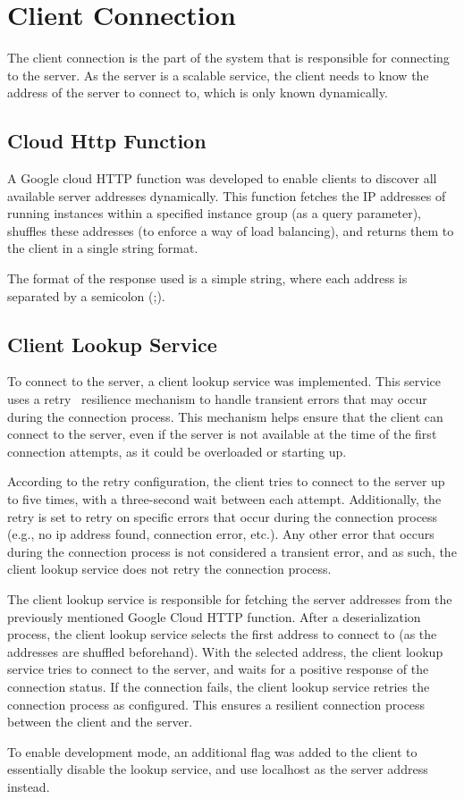 \chapter{Client Connection}\label{ch:client-connection}

The client connection is the part of the system that is responsible for connecting to the server.
As the server is a scalable service, the client needs to know the address of the server to connect to, which is only known dynamically.


\section{Cloud Http Function}\label{sec:cloud-http-functions}

A Google cloud HTTP function was developed to enable clients to discover all available server addresses dynamically.
This function fetches the IP addresses of running instances within a specified instance group (as a query parameter),
shuffles these addresses (to enforce a way of load balancing), and returns them to the client in a single string format.

The format of the response used is a simple string, where each address is separated by a semicolon (;).


\section{Client Lookup Service}\label{sec:client-lookup-service}

To connect to the server, a client lookup service was implemented.
This service uses a retry~\cite{retry-pattern} resilience mechanism to handle transient errors that may occur during the connection process. This mechanism helps ensure that the client can connect to the server,
even if the server is not available at the time of the first connection attempts, as it could be overloaded or starting up.

According to the retry configuration, the client tries to connect to the server up to five times,
with a three-second wait between each attempt.
Additionally,
the retry is set to retry on specific errors that occur during the connection process
(e.g., no ip address found, connection error, etc.).
Any other error that occurs during the connection process is not considered a transient error, and as such, the client lookup service does not retry the connection process.

The client lookup service is responsible
for fetching the server addresses from the previously mentioned Google Cloud HTTP function.
After a deserialization process, the client lookup service selects the first address to connect to
(as the addresses are shuffled beforehand).
With the selected address, the client lookup service tries to connect to the server,
and waits for a positive response of the connection status.
If the connection fails, the client lookup service retries the connection process as configured.
This ensures a resilient connection process between the client and the server.

To enable development mode, an additional flag was added to the client to essentially disable the lookup service,
and use localhost as the server address instead.
